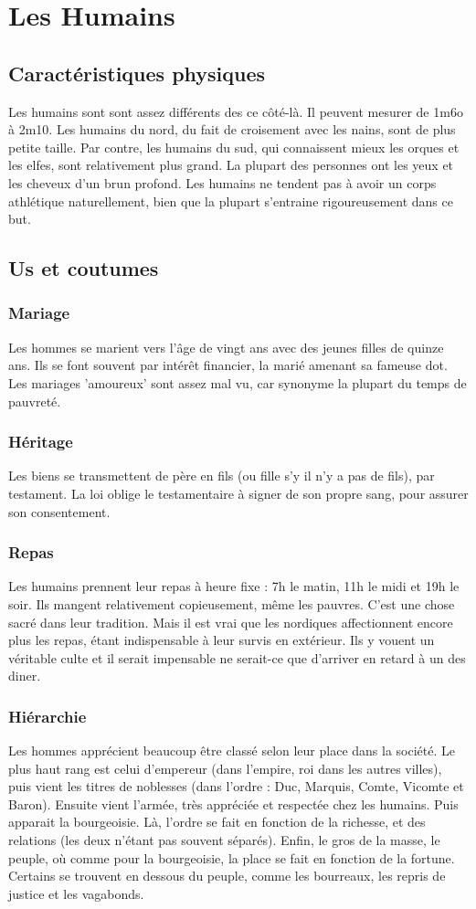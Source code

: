 \section{Les Humains}
\subsection{Caractéristiques physiques}
Les humains sont sont assez différents des ce côté-là. Il peuvent mesurer de 1m6o à 2m10. Les humains du nord, du fait de croisement avec les nains, sont de plus petite taille. Par contre, les humains du sud, qui connaissent mieux les orques et les elfes, sont relativement plus grand. La plupart des personnes ont les yeux et les cheveux d’un brun profond. Les humains ne tendent pas à avoir un corps athlétique naturellement, bien que la plupart s’entraine rigoureusement dans ce but. 
\subsection{Us et coutumes}
\subsubsection{Mariage}
Les hommes se marient vers l’âge de vingt ans avec des jeunes filles de quinze ans. Ils se font souvent par intérêt financier, la marié amenant sa fameuse dot. Les mariages ’amoureux’ sont assez mal vu, car synonyme la plupart du temps de pauvreté. 
\subsubsection{Héritage}
Les biens se transmettent de père en fils (ou fille s’y il n’y a pas de fils), par testament. La loi oblige le testamentaire à signer de son propre sang, pour assurer son consentement. 
\subsubsection{Repas}
Les humains prennent leur repas à heure fixe : 7h le matin, 11h le midi et 19h le soir. Ils mangent relativement copieusement, même les pauvres. C’est une chose sacré dans leur tradition. Mais il est vrai que les nordiques affectionnent encore plus les repas, étant indispensable à leur survis en extérieur. Ils y vouent un véritable culte et il serait impensable ne serait-ce que d'arriver en retard à un des diner. 
\subsubsection{Hiérarchie}
Les hommes apprécient beaucoup être classé selon leur place dans la société. Le plus haut rang est celui d’empereur (dans l'empire, roi dans les autres villes), puis vient les titres de noblesses (dans l’ordre : Duc, Marquis, Comte, Vicomte et Baron). Ensuite vient l’armée, très appréciée et respectée chez les humains. Puis apparait la bourgeoisie. Là, l’ordre se fait en fonction de la richesse, et des relations (les deux n’étant pas souvent séparés). Enfin, le gros de la masse, le peuple, où comme pour la bourgeoisie, la place se fait en fonction de la fortune. Certains se trouvent en dessous du peuple, comme les bourreaux, les repris de justice et les vagabonds. 
